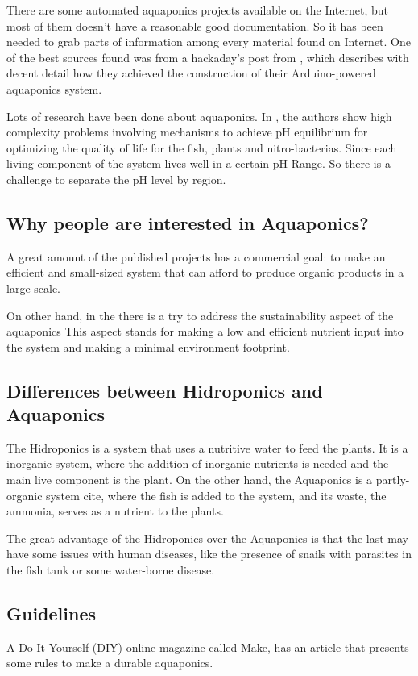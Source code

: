 There are some automated aquaponics projects available on the Internet,
but most of them doesn't have a reasonable good documentation.
So it has been needed to grab parts of information among every material found on Internet.
One of the best sources found was from a hackaday's post from \cite{GarethColeman2014},
which describes with decent detail how they achieved the construction of their Arduino-powered aquaponics system.

Lots of research have been done about aquaponics.
In \cite{GoddekDelaideMankasinghEtAl2015}, the authors show high complexity problems involving mechanisms to achieve pH equilibrium for optimizing the quality of life for the fish, plants and nitro-bacterias.
Since each living component of the system lives well in a certain pH-Range.
So there is a challenge to separate the pH level by region.

\subsection{Why people are interested in Aquaponics?}

A great amount of the published projects has a commercial goal:
to make an efficient and small-sized system that can afford to produce organic products in a large scale.

On other hand,
in the \cite{GoddekDelaideMankasinghEtAl2015} there is a try to address the sustainability aspect of the aquaponics
This aspect stands for making a low and efficient nutrient input into the system and making a minimal environment footprint.

\subsection{Differences between Hidroponics and Aquaponics}

The Hidroponics is a system that uses a nutritive water to feed the plants.
It is a inorganic system, 
where the addition of inorganic nutrients is needed and the main live component is the plant.
On the other hand, the Aquaponics is a partly-organic system cite,
where the fish is added to the system,
and its waste,
the ammonia,
serves as a nutrient to the plants.

The great advantage of the Hidroponics over the Aquaponics is that the last may have some issues with human diseases,
like the presence of snails with parasites in the fish tank or some water-borne disease.

\subsection{Guidelines}
A Do It Yourself (DIY) online magazine called Make,
has an article  that presents some rules to make a durable aquaponics.
